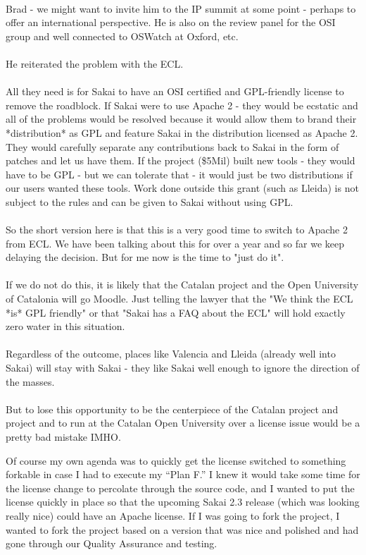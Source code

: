 \documentclass[12pt]{book}
\begin{document}
\begin{sf}
\\
Brad - we might want to invite him to the IP summit at
some point - perhaps to offer an international perspective.
He is also on the review panel for the OSI group and well
connected to OSWatch at Oxford, etc.\\
\\
He reiterated the problem with the ECL.\\
\\
All they need is for Sakai to have an OSI certified and GPL-friendly
license to remove the roadblock.  If Sakai were to use Apache 2 -
they would be ecstatic and all of the problems would be resolved
because it would allow them to brand their *distribution* as GPL
and feature Sakai in the distribution licensed as Apache 2.
They would carefully separate any contributions back to Sakai
in the form of patches and let us have them.  If the project
(\$5Mil) built new tools - they would have to be GPL - but we
can tolerate that - it would just be two distributions if our
users wanted these tools.  Work done outside this grant
(such as Lleida) is not subject to the rules and can be given
to Sakai without using GPL.\\
\\
So the short version here is that this is a very good time to
switch to Apache 2 from ECL.  We have been talking about this
for over a year and so far we keep delaying the decision.  But
for me now is the time to "just do it".\\
\\
If we do not do this, it is likely that the Catalan project and
the Open University of Catalonia will go Moodle.  Just telling
the lawyer that the "We think the ECL *is* GPL friendly" or
that "Sakai has a FAQ about the ECL" will hold exactly zero
water in this situation.\\
\\
Regardless of the outcome, places like Valencia and
Lleida (already well into Sakai) will stay with Sakai - they
like Sakai well enough to ignore the direction of the masses.\\
\\
But to lose this opportunity to be the centerpiece of the
Catalan project and project and to run at the Catalan Open
University over a license issue would be a pretty bad mistake IMHO.\\
\end{sf}

Of course my own agenda was to quickly get the license
switched to something forkable in case I had to execute
my ``Plan F.''  I knew it would take some time for the license
change to percolate through the source code, and I wanted
to put the license quickly in place so that the upcoming
Sakai 2.3 release (which was looking really nice) could
have an Apache license.  If I was going to fork the
project, I wanted to fork the project based on a version
that was nice and polished and had gone through our
Quality Assurance and testing.
\end{document}
